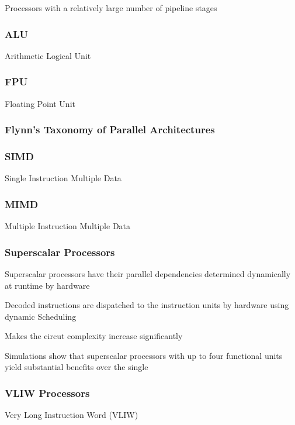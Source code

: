\documentclass{article}
\begin{document}
Processors with a relatively large number of pipeline stages

\subsubsection{ALU}

Arithmetic Logical Unit

\subsubsection{FPU}

Floating Point Unit 

\subsubsection{Flynn's Taxonomy of Parallel Architectures}

\subsubsection{SIMD}

Single Instruction Multiple Data

\subsubsection{MIMD}

Multiple Instruction Multiple Data

\subsubsection{Superscalar Processors}

Superscalar processors have their parallel dependencies determined dynamically at runtime by hardware

Decoded instructions are dispatched to the instruction units by hardware using dynamic Scheduling

Makes the circut complexity increase significantly

Simulations show that superscalar processors with up to four functional units yield substantial benefits over the single

\subsubsection{VLIW Processors}

Very Long Instruction Word (VLIW)
\end{document}
